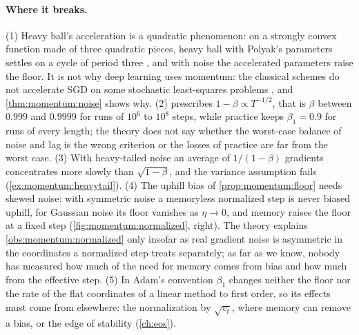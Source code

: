\begin{refsection}
\paragraph{Where it breaks.} (1) Heavy ball's acceleration is a quadratic phenomenon: on a strongly convex function made of three quadratic pieces, heavy ball with Polyak's parameters settles on a cycle of period three \parencite{LessardRechtPackard2016}, and with noise the accelerated parameters raise the floor. It is not why deep learning uses momentum: the classical schemes do not accelerate SGD on some stochastic least-squares problems \parencite{KidambiEtAl2018}, and \cref{thm:momentum:noise} shows why. (2)  prescribes $1-\beta\propto T^{-1/2}$, that is $\beta$ between $0.999$ and $0.9999$ for runs of $10^6$ to $10^8$ steps, while practice keeps $\beta_1=0.9$ for runs of every length; the theory does not say whether the worst-case balance of noise and lag is the wrong criterion or the losses of practice are far from the worst case. (3) With heavy-tailed noise an average of $1/(1-\beta)$ gradients concentrates more slowly than $\sqrt{1-\beta}$, and the variance assumption fails (\cref{ex:momentum:heavytail}). (4) The uphill bias of \cref{prop:momentum:floor} needs skewed noise: with symmetric noise a memoryless normalized step is never biased uphill, for Gaussian noise its floor vanishes as $\eta\to0$, and memory raises the floor at a fixed step (\cref{fig:momentum:normalized}, right). The theory explains \cref{obs:momentum:normalized} only insofar as real gradient noise is asymmetric in the coordinates a normalized step treats separately; as far as we know, nobody has measured how much of the need for memory comes from bias and how much from the effective step. (5) In Adam's convention $\beta_1$ changes neither the floor nor the rate of the flat coordinates of a linear method to first order, so its effects must come from elsewhere: the normalization by $\sqrt{v_t}$, where memory can remove a bias, or the edge of stability (\cref{ch:eos}).


\end{refsection}
